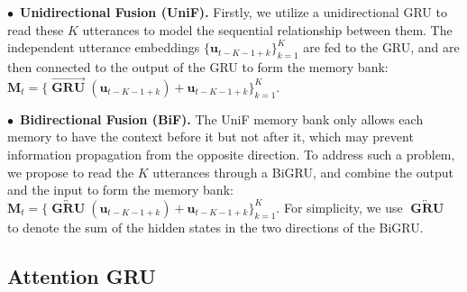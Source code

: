 \documentclass[letterpaper]{article} %
\DeclareMathOperator{\GRU}{\mathbf{GRU}}
\begin{document}
$\bullet$~\textbf{Unidirectional Fusion (UniF).} Firstly, we utilize a unidirectional GRU to read these $K$ utterances to model the sequential relationship between them. The independent utterance embeddings $\{\mathbf{u}_{t-K-1+k}\}_{k=1}^{K}$ are fed to the GRU, and are then connected to the output of the GRU to form the memory bank: $\mathbf{M}_t = \{\overrightarrow{\GRU}(\mathbf{u}_{t-K-1+k}) + \mathbf{u}_{t-K-1+k}\}_{k=1}^{K}$.

$\bullet$~\textbf{Bidirectional Fusion (BiF).} The UniF memory bank only allows each memory to have the context before it but not after it, which may prevent information propagation from the opposite direction. To address such a problem, we propose to read the $K$ utterances through a BiGRU, and combine the output and the input to form the memory bank: $\mathbf{M}_t = \{\overleftrightarrow{\GRU}(\mathbf{u}_{t-K-1+k}) + \mathbf{u}_{t-K-1+k}\}_{k=1}^{K}$. For simplicity, we use $\overleftrightarrow{\GRU}$ to denote the sum of the hidden states in the two directions of the BiGRU.


\subsection{Attention GRU}
\end{document}
